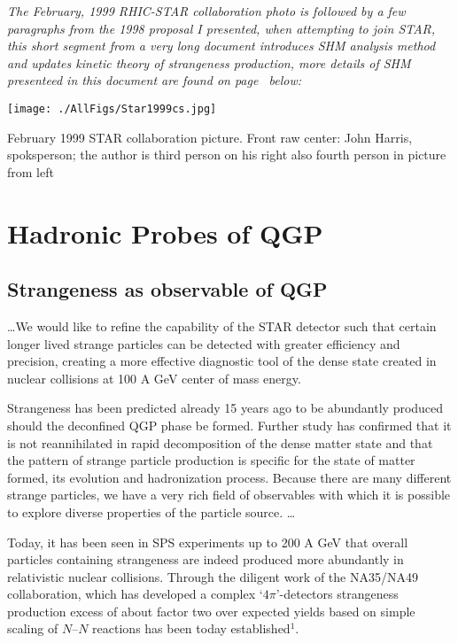 \noindent\textit{The February, 1999 RHIC-STAR collaboration photo is followed by a few paragraphs from the 1998 proposal I presented, when attempting to join STAR, this short segment from a very long document introduces SHM analysis method and updates kinetic theory of strangeness production, more details of SHM presenteed in this document  are found on  page~\pageref{SHM-STAR} below:}%
%

  
\begin{mdframed}[linecolor=gray,roundcorner=12pt,backgroundcolor=Dandelion!15,linewidth=1pt,leftmargin=0cm,rightmargin=0cm,topline=true,bottomline=true,skipabove=12pt]\relax%
\centerline{
\texttt{[image: ./AllFigs/Star1999cs.jpg]} 
} %
\noindent February 1999 STAR collaboration picture. Front raw center: John Harris, spoksperson; the author is third person on his right also fourth person in picture from left


\section*{Hadronic Probes of QGP}
\subsection*{Strangeness as observable of QGP}
\ldots  We would like to refine the capability of the STAR detector such that certain longer lived strange particles can be detected with greater efficiency and precision, creating a more effective diagnostic tool of the dense state created in nuclear collisions at 100 A GeV center of mass energy.

Strangeness has been predicted already 15 years ago to be abundantly produced should the deconfined QGP phase be formed. Further study has confirmed that it is not reannihilated in rapid decomposition of the dense matter state and that the pattern of strange particle production is specific for the state of matter formed, its evolution and hadronization process.  Because there are many different strange particles, we have a very rich field of observables with which it is possible to explore diverse properties of the particle source. \ldots  

Today, it has been seen  in SPS experiments up to 200 A GeV that overall particles containing  strangeness are indeed produced more abundantly in relativistic nuclear collisions. Through the diligent work of the NA35/NA49 collaboration, which has developed a complex `$4\pi$'-detectors strangeness production excess of about factor two over  expected yields based on simple scaling of $N$--$N$ reactions has been today established$^{1}$. 


\end{mdframed}
